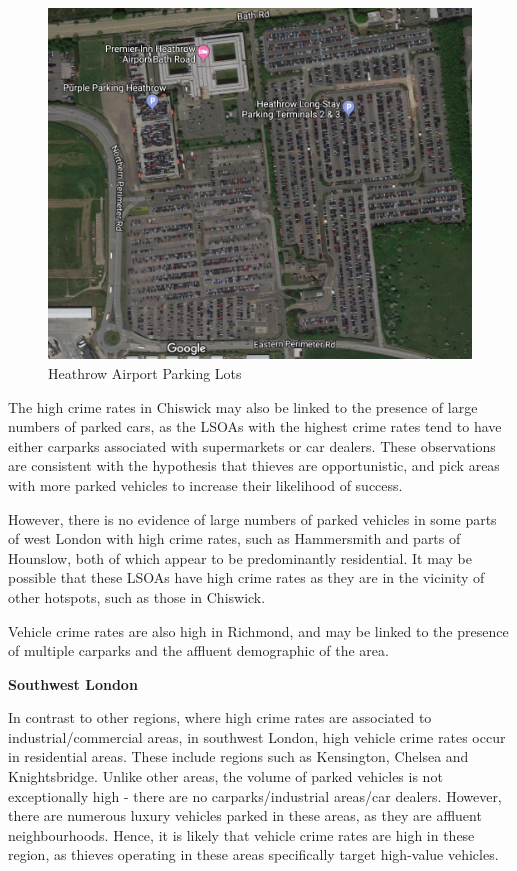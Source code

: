 \documentclass[]{article}
\theoremstyle{definition}
\theoremstyle{definition}
\theoremstyle{definition}
\theoremstyle{remark}
\begin{document}
\begin{figure}
\centering
\includegraphics{pictures/Heathrowparking.png}
\caption{Heathrow Airport Parking Lots}
\end{figure}

The high crime rates in Chiswick may also be linked to the presence of
large numbers of parked cars, as the LSOAs with the highest crime rates
tend to have either carparks associated with supermarkets or car
dealers. These observations are consistent with the hypothesis that
thieves are opportunistic, and pick areas with more parked vehicles to
increase their likelihood of success.

However, there is no evidence of large numbers of parked vehicles in
some parts of west London with high crime rates, such as Hammersmith and
parts of Hounslow, both of which appear to be predominantly residential.
It may be possible that these LSOAs have high crime rates as they are in
the vicinity of other hotspots, such as those in Chiswick.

Vehicle crime rates are also high in Richmond, and may be linked to the
presence of multiple carparks and the affluent demographic of the area.

\textbf{Southwest London}

In contrast to other regions, where high crime rates are associated to
industrial/commercial areas, in southwest London, high vehicle crime
rates occur in residential areas. These include regions such as
Kensington, Chelsea and Knightsbridge. Unlike other areas, the volume of
parked vehicles is not exceptionally high - there are no
carparks/industrial areas/car dealers. However, there are numerous
luxury vehicles parked in these areas, as they are affluent
neighbourhoods. Hence, it is likely that vehicle crime rates are high in
these region, as thieves operating in these areas specifically target
high-value vehicles.
\end{document}
